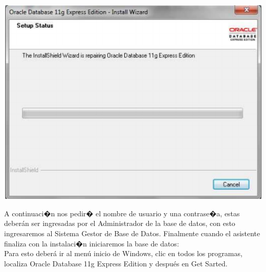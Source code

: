 \documentclass[12pt,letterpaper]{article}
\begin{document}
\begin{center}
	\includegraphics[width=15cm]{./IMG/img3}
\end{center} 

A continuaci�n nos pedir� el nombre de usuario y una contrase�a, estas deber\'an
ser ingresadas por el Administrador de la base de datos, con esto ingresaremos al
Sistema Gestor de Base de Datos. Finalmente cuando el asistente finaliza con la
instalaci�n iniciaremos la base de datos:\\
Para esto deber\'a ir al men\'u inicio de Windows, clic en todos los programas,
localiza Oracle Database 11g Express Edition y despu\'es en Get Sarted.
\end{document}
